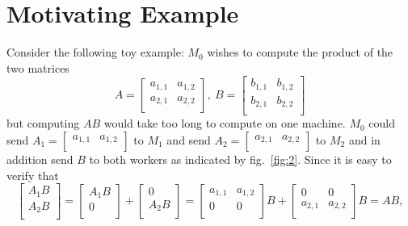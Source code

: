 \documentclass{report}
\begin{document}
\section{Motivating Example}\label{sec:mot_ex}

Consider the following toy example: $M_0$ wishes to compute the product of the two matrices 
\begin{equation*}
    A = \begin{bmatrix}a_{1,1} & a_{1,2} \\ 
    a_{2,1} & a_{2,2} \\ \end{bmatrix} , \     B = \begin{bmatrix}b_{1,1} & b_{1,2} \\ 
    b_{2,1} & b_{2,2} \\ \end{bmatrix}
\end{equation*}
but computing $AB$ would take too long to compute on one machine. $M_0$ could send $A_1 = \begin{bmatrix}a_{1,1} & a_{1,2} \\ \end{bmatrix} $ to $M_1$ and send $A_2 = \begin{bmatrix}a_{2,1} & a_{2,2} \\ \end{bmatrix}$ to $M_2$ and in addition send $B$ to both workers as indicated by fig.~\ref{fig:2}. 
Since it is easy to verify that 
\begin{equation}\label{eq:1}
 \begin{bmatrix}A_1B \\ 
    A_2B  \\ \end{bmatrix}=  \begin{bmatrix}A_1B \\ 
    0  \\ \end{bmatrix}   +  \begin{bmatrix}0\\ 
    A_2B\\ \end{bmatrix} =   \begin{bmatrix}a_{1,1} & a_{1,2} \\ 
    0 & 0 \\ \end{bmatrix} B  +  \begin{bmatrix}0& 0\\ 
    a_{2,1} & a_{2,2} \\ \end{bmatrix} B = AB , 
\end{equation}
\end{document}
